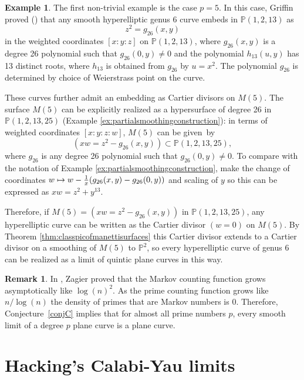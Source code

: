 \documentclass[JEP,XML,SOM,Unicode,NoFloatCountersInSection,published]{cedram}
\newcommand\mto{\mathchoice{\longmapsto}{\mapsto}{\mapsto}{\mapsto}}
\theoremstyle{plain}
\theoremstyle{definition}
\newtheorem{remark}[theorem]{Remark}
\newtheorem{example}[theorem]{Example}
\newcommand\PP{{\mathbb{P}}}
\begin{document}
\begin{example}\label{ex:quintics}
The first non-trivial example is the case $p=5$. In this case, Griffin proved (\cite[Th.\,1.A]{Griffin}) that any smooth hyperelliptic genus 6 curve embeds in $\PP(1,2,13)$ as \[ z^2 = g_{26}(x,y)\] in the weighted coordinates $[x:y:z]$ on $\PP(1,2,13)$, where $g_{26}(x,y)$ is a degree 26 polynomial such that $g_{26}(0,y) \ne 0$ and the polynomial $h_{13}(u,y)$ has 13 distinct roots, where $h_{13}$ is obtained from $g_{26}$ by $u = x^2$. The polynomial $g_{26}$ is determined by choice of Weierstrass point on the curve.

These curves further admit an embedding as Cartier divisors on $M(5)$. The surface $M(5)$ can be explicitly realized as a hypersurface of degree 26 in $\PP(1,2,13,25)$ (\cf Example \ref{ex:partialsmoothingconstruction}): in terms of weighted coordinates $[x{:}y{:}z{:}w]$, $M(5)$ can be given~by \[ (xw = z^2 - g_{26}(x,y)) \subset \PP(1,2,13,25), \] where $g_{26}$ is any degree 26 polynomial such that $g_{26}(0,y) \ne 0$. To compare with the notation of Example \ref{ex:partialsmoothingconstruction}, make the change of coordinates $w \mto w-\frac{1}{x}(g_{26}(x,y) - g_{26}(0,y))$ and scaling of $y$ so this can be expressed as $xw = z^2 + y^{13}$.

Therefore, if $M(5) = (xw = z^2 - g_{26}(x,y))$ in $\PP(1,2,13,25)$, any hyperelliptic curve can be written as the Cartier divisor $(w = 0)$ on $M(5)$. By Theorem \ref{thm:classpicofmanettisurfaces} this Cartier divisor extends to a Cartier divisor on a smoothing of $M(5)$ to $\PP^2$, so every hyperelliptic curve of genus 6 can be realized as a limit of quintic plane curves in this way.
\end{example}

\begin{remark}\label{rem:Zagier}
In \cite{Zagierdensity}, Zagier proved that the Markov counting function grows asymptotically like $\log(n)^2$. As the prime counting function grows like $n/\log(n)$ the density of primes that are Markov numbers is 0. Therefore, Conjecture~\ref{conjC} implies that for almost all prime numbers $p$, every smooth limit of a degree $p$ plane curve is a plane curve.
\end{remark}

\section{Hacking's Calabi-Yau limits}\label{sec:CYlimits}
\end{document}
